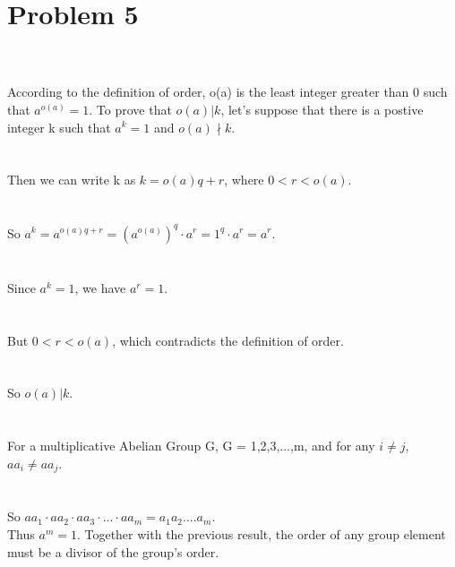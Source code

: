\documentclass{article}
\begin{document}
\section{Problem 5}
\\ \hspace*{\fill} \\
According to the definition of order, o(a) is the least integer greater than 0 such that $a^{o(a)} = 1$. To prove that $o(a)|k$, let's suppose that there is a postive integer k such that $a^k = 1$ and $o(a) \nmid k$.\\
\\ \hspace*{\fill} \\
Then we can write k as $k = o(a)q + r$, where $0 < r < o(a)$.\\
\\ \hspace*{\fill} \\
So $a^k = a^{o(a)q + r} = (a^{o(a)})^q \cdot a^r = 1^q \cdot a^r = a^r$.\\
\\ \hspace*{\fill} \\
Since $a^k = 1$, we have $a^r = 1$.\\
\\ \hspace*{\fill} \\
But $0 < r < o(a)$, which contradicts the definition of order.\\
\\ \hspace*{\fill} \\
So $o(a)|k$.\\
\\ \hspace*{\fill} \\
For a multiplicative Abelian Group G, G = {1,2,3,...,m}, and for any $i \neq j$, $aa_i \neq aa_j$.\\
\\ \hspace*{\fill} \\
So $aa_1 \cdot aa_2 \cdot aa_3 \cdot ... \cdot aa_m = a_1a_2....a_m$.\\
Thus $a^m = 1$. Together with the previous result, the order of any group element must be a divisor of the group’s order.\\
\\ \hspace*{\fill} \\
\newpage
\end{document}
